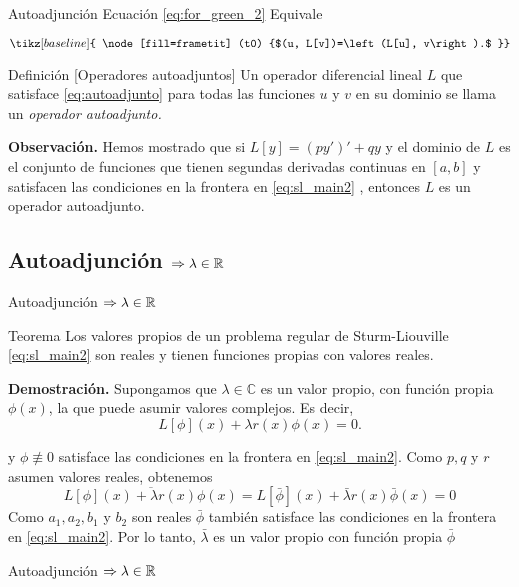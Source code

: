 {Autoadjunción} 
Ecuación \eqref{eq:for_green_2} Equivale

\begin{equation}\label{eq:autoadjunto}
 \tikz[baseline]{
      \node[fill=frametit] (t0)
           {$(u, L[v])=\left(L[u], v\right).$
    }}
\end{equation}


\begin{block}{Definición [Operadores autoadjuntos]} Un operador diferencial lineal $L$ que satisface \eqref{eq:autoadjunto} para todas las funciones $u$ y $v$ en su dominio se llama un \emph{operador autoadjunto. }
\end{block}



\textbf{Observación.} Hemos mostrado que si $L[y]=(py')'+qy$  y el dominio de $L$ es el conjunto de funciones que tienen segundas derivadas continuas en $[a, b]$ y satisfacen las condiciones en la frontera en \eqref{eq:sl_main2} , entonces $L$ es un operador autoadjunto.




\subsection{Autoadjunción $\Rightarrow \lambda\in\rr$}  
{Autoadjunción $\Rightarrow \lambda\in\rr$}

\begin{block}{Teorema} Los valores propios de un problema regular de Sturm-Liouville \eqref{eq:sl_main2}  son reales y tienen funciones propias con valores reales.
 
\end{block}


\textbf{Demostración.} Supongamos que $\lambda\in \mathbb{C}$ es un valor propio, con función propia $\phi(x)$, la que puede asumir valores complejos. Es decir,
$$L[\phi](x)+\lambda r(x) \phi(x)=0.$$

y $\phi\not\equiv 0$ satisface las condiciones en la frontera en  \eqref{eq:sl_main2}. Como $p, q$ y $r$ asumen valores reales, obtenemos
$$\overline{L[\phi](x)+\lambda r(x) \phi(x)}=L[\bar{\phi}](x)+\bar{\lambda} r(x) \bar{\phi}(x)=0$$
Como $a_{1}, a_{2}, b_{1}$ y $b_{2}$ son reales $\bar{\phi}$ también satisface las condiciones en la frontera en \eqref{eq:sl_main2}. Por lo tanto, $\bar{\lambda}$ es un valor propio con función propia $\bar{\phi}$




{Autoadjunción $\Rightarrow \lambda\in\rr$}


